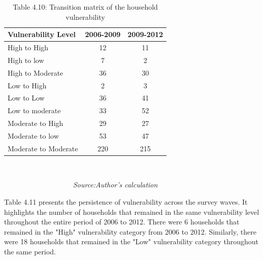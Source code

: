 \begin{table}[H]
	\captionsetup{labelformat=empty}
	\captionsetup{labelformat=empty, skip=-7pt} %
	\caption{{Table 4.10}: Transition matrix of the household vulnerability}
	\label{tab:Vulnerabilitytransitions}	\begin{center}
		\begin{tabular}{lcc} \hline
			\textbf{Vulnerability Level} & \textbf{2006-2009} & \textbf{2009-2012} \\ \hline
			High to High                 & 12                 & 11                 \\
			High to low                  & 7                  & 2                  \\
			High to Moderate             & 36                 & 30                 \\
			Low to High                  & 2                  & 3                  \\
			Low to Low                   & 36                 & 41                 \\
			Low to moderate              & 33                 & 52                 \\
			Moderate to High             & 29                 & 27                 \\
			Moderate to low              & 53                 & 47                 \\
			Moderate to Moderate         & 220                & 215       \\ \hline \hline        
		\end{tabular} \\
	\end{center}\vspace{-8pt}
	\textit{\ \ \ \ \ \ \ \ \ \ \ \ \ \ \ \ \ \ \ Source:Author's calculation}
\end{table}

Table 4.11 presents the persistence of vulnerability across the survey waves. It highlights the number of households that remained in the same vulnerability level throughout the entire period of 2006 to 2012. There were 6 households that remained in the "High" vulnerability category from 2006 to 2012. Similarly, there were 18 households that remained in the "Low" vulnerability category throughout the same period.



